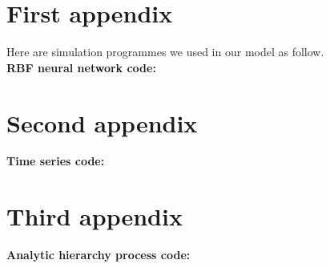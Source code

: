 \documentclass{mcmthesis}
\begin{document}
\begin{appendices}

\section{First appendix}

Here are simulation programmes we used in our model as follow.\\

\textbf{\textcolor[rgb]{0.98,0.00,0.00}{RBF neural network code:}}


\section{Second appendix}

\textcolor[rgb]{0.98,0.00,0.00}{\textbf{Time series code:}}


\newpage
\section{Third appendix}

\textcolor[rgb]{0.98,0.00,0.00}{\textbf{Analytic hierarchy process code:}}


\end{appendices}
\end{document}
